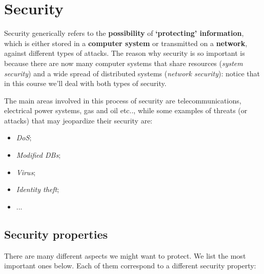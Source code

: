 \section{Security}
Security generically refers to the \textbf{possibility} of \textbf{‘protecting’ information}, which is either stored in a \textbf{computer system} or transmitted on a \textbf{network}, against different types of attacks. The reason why security is so important is because there are now many computer systems that share resources (\textit{system security}) and a wide spread of distributed systems (\textit{network security}): notice that in this course we'll deal with both types of security.

The main areas involved in this process of security are telecommunications, electrical power systems, gas and oil etc.., while some examples of threats (or attacks) that may jeopardize their security are:

\begin{itemize}
    \item \textit{DoS};
    \item \textit{Modified DBs};
    \item \textit{Virus};
    \item \textit{Identity theft};
    \item ...
\end{itemize}

\subsection{Security properties}
There are many different aspects we might want to protect. We list the most important ones below. Each of them correspond to a different security property:

